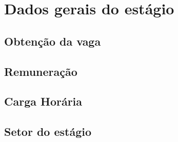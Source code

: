 \chapter{Dados gerais do estágio}\label{ch:dados}

\section{Obtenção da vaga}\label{sec:obtencao}

\section{Remuneração}\label{sec:remuneracao}

\section{Carga Horária}\label{sec:cargahoraria}

\section{Setor do estágio}\label{sec:setorestagio}

